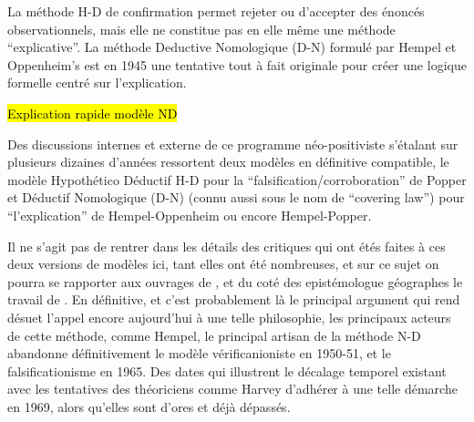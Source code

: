 La méthode H-D de confirmation permet rejeter ou d'accepter des énoncés observationnels, mais elle ne constitue pas en elle même une méthode \enquote{explicative}. La méthode Deductive Nomologique (D-N) formulé par Hempel et Oppenheim’s  est en 1945 une tentative tout à fait originale pour créer une logique formelle centré sur l'explication.

\hl{Explication rapide modèle ND}

Des discussions internes et externe de ce programme néo-positiviste s'étalant sur plusieurs dizaines d'années ressortent deux modèles en définitive compatible, le modèle Hypothético Déductif H-D pour la \enquote{falsification/corroboration} de Popper et Déductif Nomologique (D-N) (connu aussi sous le nom de \foreignquote{english}{covering law}) pour \enquote{l'explication} de Hempel-Oppenheim ou encore Hempel-Popper.

Il ne s'agit pas de rentrer dans les détails des critiques qui ont étés faites à ces deux versions de modèles ici, tant elles ont été nombreuses, et sur ce sujet on pourra se rapporter aux ouvrages de \textcite{Chalmers1987}, \textcite[214-215]{Meyer1979} et du coté des epistémologue géographes le travail de \autocite{Besse2000}. En définitive, et c'est probablement là le principal argument qui rend désuet l'appel encore aujourd'hui à une telle philosophie, les principaux acteurs de cette méthode, comme Hempel, le principal artisan de la méthode N-D abandonne définitivement le modèle vérificanioniste en 1950-51, et le falsificationisme en 1965. Des dates qui illustrent le décalage temporel existant avec les tentatives des théoriciens comme Harvey d'adhérer à une telle démarche en 1969, alors qu'elles sont d'ores et déjà dépassés.


